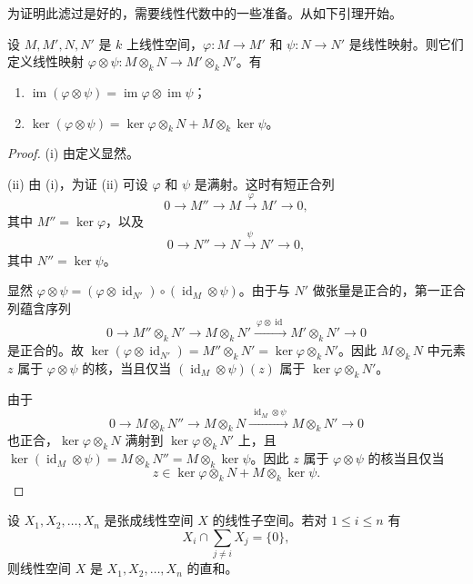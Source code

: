 为证明此滤过是好的，需要线性代数中的一些准备。从如下引理开始。

\begin{lemma}
设 $M,M',N,N'$ 是 $k$ 上线性空间，$\varphi:M\to M'$ 和 $\psi:N\to N'$ 是线性映射。则它们定义线性映射 $\varphi\otimes\psi:M\otimes_k N\to M'\otimes_k N'$。有
\begin{enumerate}[label=(\roman*)]
  \item $\operatorname{im}(\varphi\otimes\psi)=\operatorname{im}\varphi\otimes\operatorname{im}\psi$；
  \item $\ker(\varphi\otimes\psi)=\ker\varphi\otimes_k N+M\otimes_k\ker\psi$。
\end{enumerate}
\end{lemma}

\begin{proof}
(i) 由定义显然。

(ii) 由 (i)，为证 (ii) 可设 $\varphi$ 和 $\psi$ 是满射。这时有短正合列
$$0\longrightarrow M''\longrightarrow M\xrightarrow{\ \varphi\ }M'\longrightarrow 0,$$
其中 $M''=\ker\varphi$，以及
$$0\longrightarrow N''\longrightarrow N\xrightarrow{\ \psi\ }N'\longrightarrow 0,$$
其中 $N''=\ker\psi$。

显然 $\varphi\otimes\psi=(\varphi\otimes\operatorname{id}_{N'})\circ(\operatorname{id}_M\otimes\psi)$。由于与 $N'$ 做张量是正合的，第一正合列蕴含序列
$$0\longrightarrow M''\otimes_k N'\longrightarrow M\otimes_k N'\xrightarrow{\ \varphi\otimes\operatorname{id}\ }M'\otimes_k N'\longrightarrow 0$$
是正合的。故 $\ker(\varphi\otimes\operatorname{id}_{N'})=M''\otimes_k N'=\ker\varphi\otimes_k N'$。因此 $M\otimes_k N$ 中元素 $z$ 属于 $\varphi\otimes\psi$ 的核，当且仅当 $(\operatorname{id}_M\otimes\psi)(z)$ 属于 $\ker\varphi\otimes_k N'$。

由于
$$0\longrightarrow M\otimes_k N''\longrightarrow M\otimes_k N\xrightarrow{\ \operatorname{id}_M\otimes\psi\ }M\otimes_k N'\longrightarrow 0$$
也正合，$\ker\varphi\otimes_k N$ 满射到 $\ker\varphi\otimes_k N'$ 上，且 $\ker(\operatorname{id}_M\otimes\psi)=M\otimes_k N''=M\otimes_k\ker\psi$。因此 $z$ 属于 $\varphi\otimes\psi$ 的核当且仅当
$$z\in\ker\varphi\otimes_k N+M\otimes_k\ker\psi.$$
\end{proof}

\begin{lemma}
设 $X_1,X_2,\dots,X_n$ 是张成线性空间 $X$ 的线性子空间。若对 $1\le i\le n$ 有
$$X_i\cap\sum_{j\neq i}X_j=\{0\},$$
则线性空间 $X$ 是 $X_1,X_2,\dots,X_n$ 的直和。
\end{lemma}

